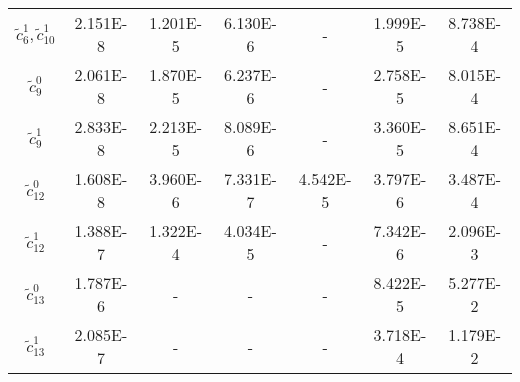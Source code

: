 \documentclass{book}[12pt]
\begin{document}
\begin{table}
\begin{tabular}{|c|c|c|c|c|c|c|}
$\tilde{c}_6^1,\tilde{c}_{10}^1$ & 2.151E-8 & 1.201E-5 & 6.130E-6 & - & 1.999E-5 & 8.738E-4 \\
$\tilde{c}_9^0$ & 2.061E-8 & 1.870E-5 & 6.237E-6 & - & 2.758E-5 & 8.015E-4 \\
$\tilde{c}_9^1$ & 2.833E-8 & 2.213E-5 & 8.089E-6 & - & 3.360E-5 & 8.651E-4 \\
$\tilde{c}_{12}^0$ & 1.608E-8 & 3.960E-6 & 7.331E-7 & 4.542E-5 & 3.797E-6 & 3.487E-4 \\
$\tilde{c}_{12}^1$ & 1.388E-7 & 1.322E-4 & 4.034E-5 & - & 7.342E-6 & 2.096E-3 \\
$\tilde{c}_{13}^0$ & 1.787E-6 & - & - & - & 8.422E-5 & 5.277E-2 \\
$\tilde{c}_{13}^1$ & 2.085E-7 & - & - & - & 3.718E-4 & 1.179E-2 \\[2.6pt]
\hline
\end{tabular}
\end{table} 
\end{document}
